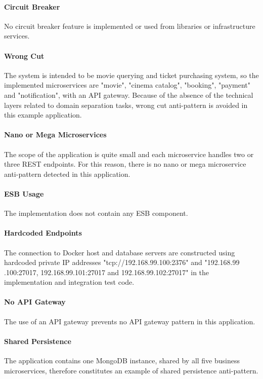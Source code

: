 \documentclass{Configuration_Files/PoliMi3i_thesis}
\begin{document}
\paragraph{Circuit Breaker} No circuit breaker feature is implemented or used from libraries or infrastructure services.

\paragraph{Wrong Cut} The system is intended to be movie querying and ticket purchasing system, so the implemented microservices are "movie", "cinema catalog", "booking", "payment" and "notification", with an API gateway.
Because of the absence of the technical layers related to domain separation tasks, wrong cut anti-pattern is avoided in this example application.

\paragraph{Nano or Mega Microservices} The scope of the application is quite small and each microservice handles two or three REST endpoints.
For this reason, there is no nano or mega microservice anti-pattern detected in this application.

\paragraph{ESB Usage} The implementation does not contain any ESB component.

\paragraph{Hardcoded Endpoints} The connection to Docker host and database servers are constructed using hardcoded private IP addresses "tcp://192.168.99.100:2376" and "192.168.99   .100:27017, 192.168.99.101:27017 and 192.168.99.102:27017" in the implementation and integration test code.

\paragraph{No API Gateway} The use of an API gateway prevents no API gateway pattern in this application.

\paragraph{Shared Persistence} The application contains one MongoDB instance, shared by all five business microservices, therefore constitutes an example of shared persistence anti-pattern.
\end{document}
